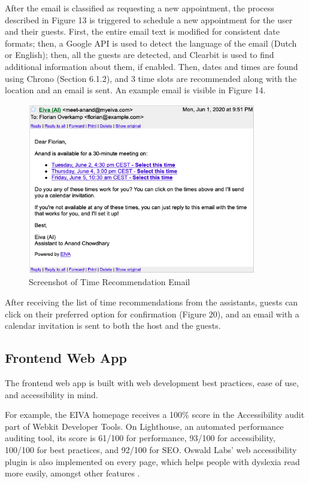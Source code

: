 \documentclass{article}
\begin{document}
After the email is classified as requesting a new appointment, the process described in Figure 13 is triggered to schedule a new appointment for the user and their guests. First, the entire email text is modified for consistent date formats; then, a Google API is used to detect the language of the email (Dutch or English); then, all the guests are detected, and Clearbit is used to find additional information about them, if enabled. Then, dates and times are found using Chrono (Section 6.1.2), and 3 time slots are recommended along with the location and an email is sent. An example email is visible in Figure 14.

\begin{figure}[h]
	\center
	\includegraphics[width=10cm]{screenshot-dates.png}
	\caption{Screenshot of Time Recommendation Email}
\end{figure}

After receiving the list of time recommendations from the assistants, guests can click on their preferred option for confirmation (Figure 20), and an email with a calendar invitation is sent to both the host and the guests.

\subsection{Frontend Web App}

The frontend web app is built with web development best practices, ease of use, and accessibility in mind.

For example, the EIVA homepage receives a 100\% score in the Accessibility audit part of Webkit Developer Tools. On Lighthouse, an automated performance auditing tool, its score is 61/100 for performance, 93/100 for accessibility, 100/100 for best practices, and 92/100 for SEO. Oswald Labs' web accessibility plugin is also implemented on every page, which helps people with dyslexia read more easily, amongst other features \cite{gupta_improving_2019}.
\end{document}
